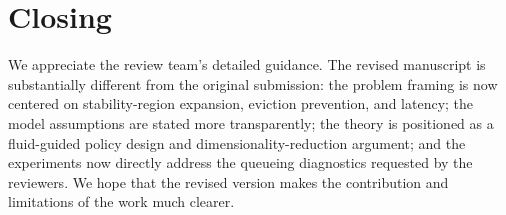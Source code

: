 \documentclass[11pt]{article}
\begin{document}
\section*{Closing}

We appreciate the review team's detailed guidance. The revised manuscript is substantially different from the original submission: the problem framing is now centered on stability-region expansion, eviction prevention, and latency; the model assumptions are stated more transparently; the theory is positioned as a fluid-guided policy design and dimensionality-reduction argument; and the experiments now directly address the queueing diagnostics requested by the reviewers. We hope that the revised version makes the contribution and limitations of the work much clearer.
\end{document}
